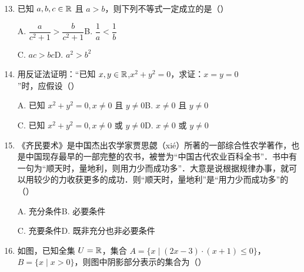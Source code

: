 \begin{enumerate}
\setcounter{enumi}{12}

\item 已知 $a,b,c\in\mathbb{R}$ 且 $a>b$，则下列不等式一定成立的是\mbox{（\quad）}

\keepwithprev
A. $\dfrac{a}{c^2+1}>\dfrac{b}{c^2+1}$\qquad B. $\dfrac1a<\dfrac1b$

C. $ac>bc$\qquad D. $a^2>b^2$

\ifanswer
\solbegin
{}
\solend
\fi

\item 用反证法证明：“已知 $x,y\in\mathbb{R}$,$x^2+y^2=0$，求证：$x=y=0$”时，应假设\mbox{（\quad）}

\keepwithprev
A. 已知 $x^2+y^2=0,x\neq0$ 且 $y\neq0$\qquad B. $x\neq0$ 且 $y\neq0$

C. 已知 $x^2+y^2=0,x\neq0$ 或 $y\neq0$\qquad D. $x\neq0$ 或 $y\neq0$


\item 《齐民要术》是中国杰出农学家贾思勰（xié）所著的一部综合性农学著作，也是中国现存最早的一部完整的农书，被誉为“中国古代农业百科全书”．书中有一句为“顺天时，量地利，则用力少而成功多”．大意是说根据规律办事，就可以用较少的力收获更多的成功．则“顺天时，量地利”是“用力少而成功多”的\mbox{（\quad）}

\keepwithprev
A. 充分条件\qquad B. 必要条件

C. 充要条件\qquad D. 既非充分也非必要条件

\ifanswer
\solbegin
{}
\solend
\fi


\item 如图，已知全集 $U=\mathbb{R}$，集合 $A=\{x\mid(2x-3)\cdot(x+1)\leqslant0\}$，$B=\{x\mid x>0\}$，则图中阴影部分表示的集合为\mbox{（\quad）}


\end{enumerate}
